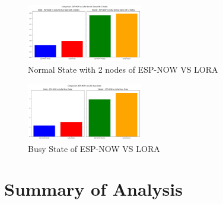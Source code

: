 \begin{figure}[H]
  \begin{center}
    \includegraphics[width=0.45\textwidth]{./Figures/Average_Power_Consumption/ESP-NOW_vs_LORA_Normal_2_nodes.png}
  \end{center}
  \caption{Normal State with 2 nodes of ESP-NOW VS LORA}\label{fig:esp_lora_2}
\end{figure}


\begin{figure}[H]
  \begin{center}
    \includegraphics[width=0.45\textwidth]{./Figures/Average_Power_Consumption/ESP-NOW_vs_LORA_Busy.png}
  \end{center}
  \caption{Busy State of ESP-NOW VS LORA}\label{fig:loramaster_power_consumption}
\end{figure}



\section{Summary of Analysis}\label{analysis_summary}




